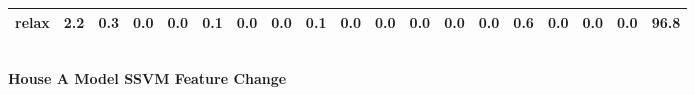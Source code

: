 \documentclass{article}
\begin{document}
\begin{sideways}
\begin{tabular}{lrrrrrrrrrrrrrrrrrr}
relax                         &         2.2 &                0.3 &           0.0 &                          0.0 &                0.1 &                0.0 &                        0.0 &          0.1 &              0.0 &                0.0 &                    0.0 &                      0.0 &                  0.0 &                   0.6 &              0.0 &              0.0 &                                  0.0 &         96.8 \\
\bottomrule
\end{tabular}
\end{sideways}
\normalsize
\vspace{1cm}\\
\textbf{House A Model SSVM Feature Change}\\
\vspace{1cm}\\
\end{document}
